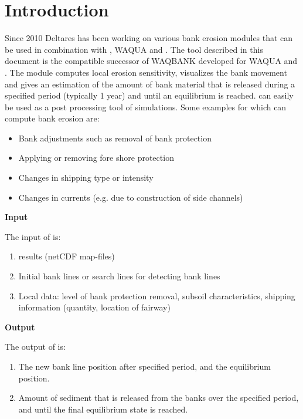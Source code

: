 \chapter{Introduction} \label{Chp:Introduction}

Since 2010 Deltares has been working on various bank erosion modules that can be used in combination with \dflow, WAQUA and \dflowfm.
The \dfastbe tool described in this document is the \dflowfm compatible successor of WAQBANK developed for WAQUA and \dflow.
The module computes local erosion sensitivity, visualizes the bank movement and gives an estimation of the amount of bank material that is released during a specified period (typically 1 year) and until an equilibrium is reached.
\dfastbe can easily be used as a post processing tool of \dflowfm simulations.
Some examples for which \dfastbe can compute bank erosion are:

\begin{itemize}
\item Bank adjustments such as removal of bank protection
\item Applying or removing fore shore protection
\item Changes in shipping type or intensity
\item Changes in currents (e.g. due to construction of side channels)
\end{itemize}

\textbf{Input}

The input of \dfastbe is:

\begin{enumerate}
\item \dflowfm results (netCDF map-files)
\item Initial bank lines or search lines for detecting bank lines
\item Local data: level of bank protection removal, subsoil characteristics, shipping information (quantity, location of fairway)
\end{enumerate}

\textbf{Output}

The output of \dfastbe is:

\begin{enumerate}
\item The new bank line position after specified period, and the equilibrium position.
\item Amount of sediment that is released from the banks over the specified period, and until the final equilibrium state is reached.
\end{enumerate}

